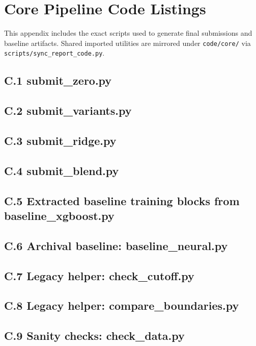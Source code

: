 \section{Core Pipeline Code Listings}

This appendix includes the exact scripts used to generate final submissions and baseline artifacts. Shared imported utilities are mirrored under \texttt{code/core/} via \texttt{scripts/sync\_report\_code.py}.

\subsection*{C.1 submit\_zero.py}


\subsection*{C.2 submit\_variants.py}


\subsection*{C.3 submit\_ridge.py}


\subsection*{C.4 submit\_blend.py}


\subsection*{C.5 Extracted baseline training blocks from baseline\_xgboost.py}


\subsection*{C.6 Archival baseline: baseline\_neural.py}


\subsection*{C.7 Legacy helper: check\_cutoff.py}


\subsection*{C.8 Legacy helper: compare\_boundaries.py}


\subsection*{C.9 Sanity checks: check\_data.py}

